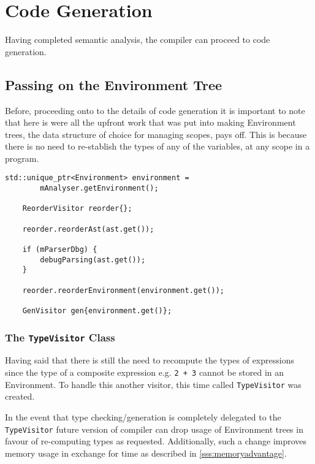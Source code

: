\section{Code Generation}

Having completed semantic analysis, the compiler
can proceed to code generation.

\subsection{Passing on the Environment Tree}

Before, proceeding onto to the details of code generation it is
important to note that here is were all the upfront work that
was put into making Environment trees, the data structure of
choice for managing scopes, pays off. This is because there is
no need to re-stablish the types of any of the variables, at any
scope in a program.

\begin{lstlisting}[caption={Getting the global environment from
the \texttt{AnalysisVisitor} and passing it on for reordering
and code generation (runner/Runner.cpp)}]
    std::unique_ptr<Environment> environment =
        mAnalyser.getEnvironment();

    ReorderVisitor reorder{};

    reorder.reorderAst(ast.get());

    if (mParserDbg) {
        debugParsing(ast.get());
    }

    reorder.reorderEnvironment(environment.get());

    GenVisitor gen{environment.get()};
\end{lstlisting}

\subsubsection{The \texttt{TypeVisitor} Class}

Having said that there is still the need to recompute the types
of expressions since the type of a composite expression e.g.
\texttt{2 + 3} cannot be stored in an Environment. To handle
this another visitor, this time called \texttt{TypeVisitor} was
created.

\begin{todo}
In the event that type checking/generation is completely
delegated to the \texttt{TypeVisitor} future version of compiler
can drop usage of Environment trees in favour of re-computing
types as requested. Additionally, such a change improves memory
usage in exchange for time as described in
\ref{sss:memoryadvantage}.
\end{todo}

